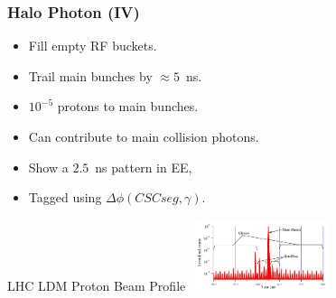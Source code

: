 \documentclass{beamer}
\begin{document}
\begin{frame}
\frametitle{Halo Photon (IV)}
 \begin{minipage}[t]{0.85\paperwidth}
    \begin{tcolorbox}[colback=UNL@Cream!5,colframe=UMN@Maroon!40,title=\textcolor{black}{ \textbf{Satellite/Ghost Beam Halos}}]
      \begin{itemize}
       \item Fill empty RF buckets.
       \item Trail main bunches by $\approx 5$~ns.
       \item $10^{-5}$ protons to main bunches.
       \item Can contribute to main collision photons.
       \item Show a $2.5$~ns pattern in EE,
       \item Tagged using $\Delta\phi(CSC seg, \gamma)$.
      \end{itemize} 
      \end{tcolorbox}
 \end{minipage}
 \begin{minipage}[t]{0.95\paperwidth}
    \centering
    \begin{varblock}[6cm]{LHC LDM Proton Beam Profile}
    \centering
    \mbox{
     \includegraphics[height=2.1cm,width=0.8\linewidth]{THESISPLOTS/Ghost-Satellite-Bunches-LDM.png} 
     }
     \end{varblock}  
 \end{minipage}
 
\end{frame}
\end{document}
